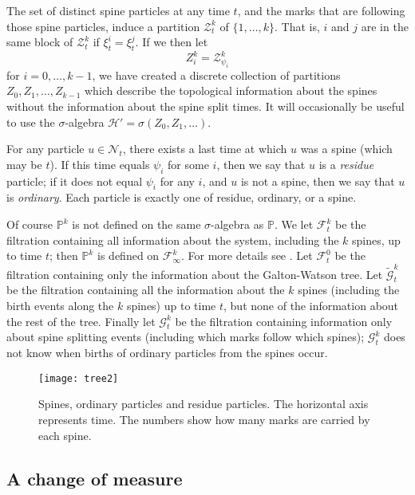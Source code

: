 \documentclass{article}
\theoremstyle{plain}
\theoremstyle{definition}
\renewcommand{\P}{\mathbb{P}}
\newcommand{\F}{\mathcal{F}}
\newcommand{\G}{\mathcal{G}}
\newcommand{\Gt}{\tilde{\mathcal{G}}}
\newcommand{\Nc}{\mathcal{N}}
\begin{document}
The set of distinct spine particles at any time $t$, and the marks that are following those spine particles, induce a partition $\mathcal Z^k_t$ of $\{1,\ldots,k\}$. That is, $i$ and $j$ are in the same block of $\mathcal Z^k_t$ if $\xi^i_t = \xi^j_t$. If we then let
\[Z^k_i = \mathcal Z^k_{\psi_i}\]
for $i=0,\ldots,k-1$, we have created a discrete collection of partitions $Z_0,Z_1,\ldots,Z_{k-1}$ which describe the topological information about the spines without the information about the spine split times. It will occasionally be useful to use the $\sigma$-algebra $\mathcal H' = \sigma(Z_0,Z_1,\ldots)$.


For any particle $u\in\Nc_t$, there exists a last time at which $u$ was a spine (which may be $t$). If this time equals $\psi_i$ for some $i$, then we say that $u$ is a \emph{residue} particle; if it does not equal $\psi_i$ for any $i$, and $u$ is not a spine, then we say that $u$ is \emph{ordinary}. Each particle is exactly one of residue, ordinary, or a spine.


Of course $\P^k$ is not defined on the same $\sigma$-algebra as $\P$. We let $\F^k_t$ be the filtration containing all information about the system, including the $k$ spines, up to time $t$; then $\P^k$ is defined on $\F^k_\infty$. For more details see \cite[Section 5]{harris_roberts:many_to_few}. Let $\F^0_t$ be the filtration containing only the information about the Galton-Watson tree. Let $\Gt^k_t$ be the filtration containing all the information about the $k$ spines (including the birth events along the $k$ spines) up to time $t$, but none of the information about the rest of the tree. Finally let $\G^k_t$ be the filtration containing information only about spine splitting events (including which marks follow which spines); $\G^k_t$ does not know when births of ordinary particles from the spines occur.

  \begin{figure}[h!]
  \centering
   \texttt{[image: tree2]}
   \vspace{-5mm}
  \caption{\small{Spines, ordinary particles and residue particles. The horizontal axis represents time. The numbers show how many marks are carried by each spine.} \label{skelfig}}
  \end{figure}


\subsection{A change of measure}
\end{document}
